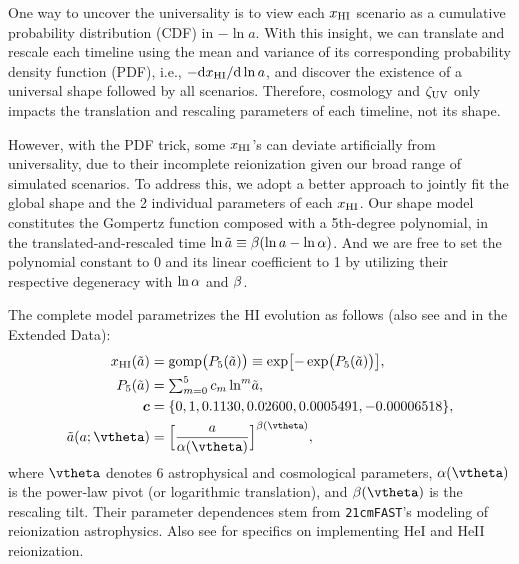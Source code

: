 One way to uncover the universality is to view each $x_{\mathrm{HI}}$ scenario as
a cumulative probability distribution (CDF) in $- \ln a$.
With this insight, we can translate and rescale each timeline using the
mean and variance of its corresponding probability density function
(PDF), i.e., $- \mathrm{d}x_{\mathrm{HI}} / \mathrm{d}\ln a$, and discover the
existence of a universal shape followed by all scenarios.
Therefore, cosmology and $\zeta_\mathrm{UV}$ only impacts the translation and
rescaling parameters of each timeline, not its shape.

However, with the PDF trick, some $x_{\mathrm{HI}}$'s can deviate artificially
from universality, due to their incomplete reionization given our broad
range of simulated scenarios.
To address this, we adopt a better approach to jointly fit the global
shape and the 2 individual parameters of each $x_{\mathrm{HI}}$.
Our shape model constitutes the Gompertz function composed with a
5th-degree polynomial, in the translated-and-rescaled time $\ln\tilde{a}
\equiv \beta (\ln a - \ln\alpha)$.
And we are free to set the polynomial constant to 0 and its linear
coefficient to 1 by utilizing their respective degeneracy with $\ln\alpha$
and $\beta$.

The complete model parametrizes the HI evolution as follows (also see
 and  in the Extended Data):
%
\begin{align}
\label{eq:uni}
x_\HI(\ar) &= \gomp\bigl( P_5(\ar) \bigr)
  \equiv \exp\bigl[ - \exp\bigl( P_5(\ar) \bigr) \bigr], \\
%
\label{eq:poly}
P_5(\ar) &= {\textstyle\sum}_{m=0}^5 \, c_m \ln^m\!\ar, \\
%
\bm{c} &= \{0, 1, 0.1130, 0.02600, 0.0005491, -0.00006518\}, \nonumber\\
%
\label{eq:map}
\ar(a; \vtheta) &= \Bigl[ \frac{a}{\ap(\vtheta)} \Bigr]^{\tilt(\vtheta)},
\end{align}
%
where $\vtheta$ denotes 6 astrophysical and cosmological parameters,
$\ap(\vtheta)$ is the power-law pivot (or logarithmic translation), and
$\tilt(\vtheta)$ is the rescaling tilt.
Their parameter dependences stem from \texttt{21cmFAST}'s modeling of
reionization astrophysics.
Also see  for specifics on implementing HeI and
HeII reionization.

